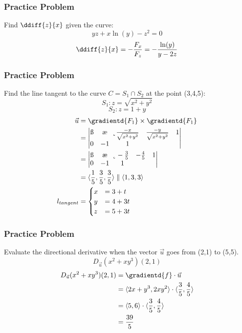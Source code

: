 \documentclass[letterpaper, 12pt]{math}
\begin{document}
\subsubsection*{Practice Problem}
Find \( \ddiff{z}{x} \) given the curve:
\[ yz +x\ln(y)-z^2 = 0 \]
\[ \ddiff{z}{x} = -\frac{F_x}{F_z} = -\frac{\ln(y)}{y-2z} \]

\subsubsection*{Practice Problem}
Find the line tangent to the curve \( C = S_1\cap S_2 \) at the point (3,4,5):
\[ S_1: z = \sqrt{x^2+y^2} \]
\[ S_2: z = 1+y \]
\begin{align*}
  \vec{u} &= \gradientd{F_1}\times\gradientd{F_1} \\
  &= \begin{vmatrix}
    \i & \j & \k \\
    \frac{-x}{\sqrt{x^2+y^2}} & \frac{-y}{\sqrt{x^2+y^2}} & 1 \\
    0 & -1 & 1
  \end{vmatrix} \\
  &= \begin{vmatrix}
    \i & \j & \k \\
    -\frac{3}{5} & -\frac{4}{5} & 1 \\
    0 & -1 & 1
  \end{vmatrix} \\
  &= \langle\frac{1}{5},\frac{3}{5},\frac{3}{5}\rangle \parallel
    \langle1,3,3\rangle \\
  l_{tangent} &= \begin{cases}
    x &= 3+t \\
    y &= 4+3t \\
    z &= 5+3t
  \end{cases}
\end{align*}

\subsubsection*{Practice Problem}
Evaluate the directional derivative when the vector \( \vec{u} \) goes from
(2,1) to (5,5).
\[ D_{\vec{u}}(x^2+xy^3)(2,1) \]
\begin{align*}
  D_{\vec{u}}(x^2+xy^3)(2,1) &= \gradientd{f}\cdot\vec{u} \\
  &= \langle2x+y^3,2xy^2\rangle\cdot\langle\frac{3}{5},\frac{4}{5}\rangle \\
  &= \langle5,6\rangle\cdot\langle\frac{3}{5},\frac{4}{5}\rangle \\
  &= \frac{39}{5}
\end{align*}
\end{document}
